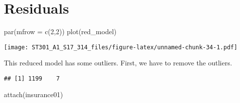 \documentclass[
]{article}
\newenvironment{Shaded}{\begin{snugshade}}{\end{snugshade}}
\newcommand{\AttributeTok}[1]{\textcolor[rgb]{0.77,0.63,0.00}{#1}}
\newcommand{\DecValTok}[1]{\textcolor[rgb]{0.00,0.00,0.81}{#1}}
\newcommand{\FloatTok}[1]{\textcolor[rgb]{0.00,0.00,0.81}{#1}}
\newcommand{\FunctionTok}[1]{\textcolor[rgb]{0.00,0.00,0.00}{#1}}
\newcommand{\NormalTok}[1]{#1}
\newcommand{\OtherTok}[1]{\textcolor[rgb]{0.56,0.35,0.01}{#1}}
\newcommand{\SpecialCharTok}[1]{\textcolor[rgb]{0.00,0.00,0.00}{#1}}
\begin{document}
\hypertarget{residuals}{%
\section{Residuals}\label{residuals}}

\begin{Shaded}
\begin{Highlighting}[]
\FunctionTok{par}\NormalTok{(}\AttributeTok{mfrow =} \FunctionTok{c}\NormalTok{(}\DecValTok{2}\NormalTok{,}\DecValTok{2}\NormalTok{))}
\FunctionTok{plot}\NormalTok{(red\_model)}
\end{Highlighting}
\end{Shaded}

\texttt{[image: ST301\_A1\_S17\_314\_files/figure-latex/unnamed-chunk-34-1.pdf]}

This reduced model has some outliers. First, we have to remove the
outliers.

\begin{Shaded}
\end{Shaded}

\begin{verbatim}
## [1] 1199    7
\end{verbatim}

\begin{Shaded}
\begin{Highlighting}[]
\FunctionTok{attach}\NormalTok{(insurance01)}
\end{Highlighting}
\end{Shaded}
\end{document}
